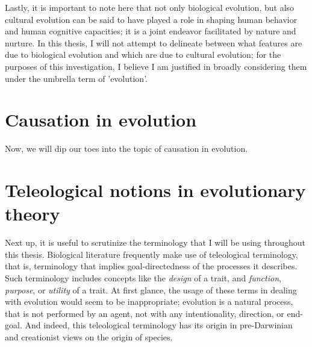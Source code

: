 Lastly, it is important to note here that not only biological evolution, but also cultural evolution can be said to have played a role in shaping human behavior and human cognitive capacities; it is a joint endeavor facilitated by nature and nurture. In this thesis, I will not attempt to delineate between what features are due to biological evolution and which are due to cultural evolution; for the purposes of this investigation, I believe I am justified in broadly considering them under the umbrella term of 'evolution'.

\section{Causation in evolution}
\label{sec:causation-evolution}

Now, we will dip our toes into the topic of causation in evolution.

\section{Teleological notions in evolutionary theory}

Next up, it is useful to scrutinize the terminology that I will be using throughout this thesis.
Biological literature frequently make use of teleological terminology, that is, terminology that implies goal-directedness of the processes it describes. Such terminology includes concepts like the \emph{design} of a trait, and \emph{function}, \emph{purpose}, or \emph{utility} of a trait.
At first glance, the usage of these terms in dealing with evolution would seem to be inappropriate; evolution is a natural process, that is not performed by an agent, not with any intentionality, direction, or end-goal. And indeed, this teleological terminology has its origin in pre-Darwinian and creationist views on the origin of species.

